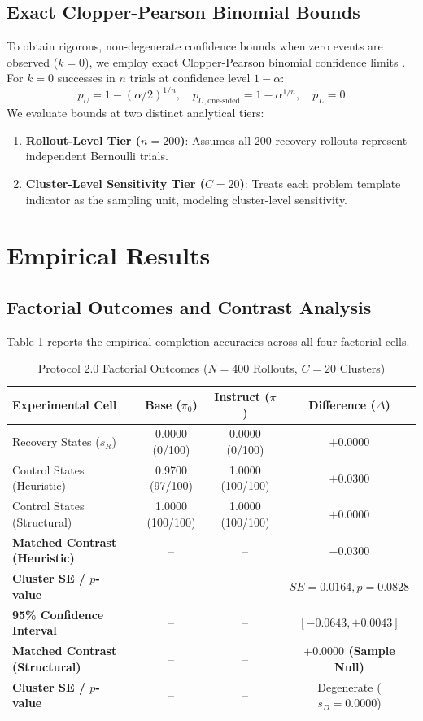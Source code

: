 \documentclass[11pt,letterpaper]{article}
\begin{document}
\subsection{Exact Clopper-Pearson Binomial Bounds}
To obtain rigorous, non-degenerate confidence bounds when zero events are observed ($k=0$), we employ exact Clopper-Pearson binomial confidence limits \cite{clopper1934use}. For $k=0$ successes in $n$ trials at confidence level $1 - \alpha$:
\begin{equation}
p_U = 1 - (\alpha/2)^{1/n}, \quad p_{U, \text{one-sided}} = 1 - \alpha^{1/n}, \quad p_L = 0
\end{equation}
We evaluate bounds at two distinct analytical tiers:
\begin{enumerate}
    \item \textbf{Rollout-Level Tier ($n=200$)}: Assumes all 200 recovery rollouts represent independent Bernoulli trials.
    \item \textbf{Cluster-Level Sensitivity Tier ($C=20$)}: Treats each problem template indicator as the sampling unit, modeling cluster-level sensitivity.
\end{enumerate}

\section{Empirical Results}

\subsection{Factorial Outcomes and Contrast Analysis}
Table \ref{tab:outcomes} reports the empirical completion accuracies across all four factorial cells.

\begin{table}[htbp]
\centering
\small
\caption{Protocol 2.0 Factorial Outcomes ($N=400$ Rollouts, $C=20$ Clusters)}
\label{tab:outcomes}
\begin{tabular}{lccc}
\toprule
\textbf{Experimental Cell} & \textbf{Base ($\pi_0$)} & \textbf{Instruct ($\pi$)} & \textbf{Difference ($\Delta$)} \\
\midrule
Recovery States ($s_R$) & 0.0000 (0/100) & 0.0000 (0/100) & $+0.0000$ \\
Control States (Heuristic) & 0.9700 (97/100) & 1.0000 (100/100) & $+0.0300$ \\
Control States (Structural) & 1.0000 (100/100) & 1.0000 (100/100) & $+0.0000$ \\
\midrule
\textbf{Matched Contrast (Heuristic)} & -- & -- & \textbf{$-0.0300$} \\
\textbf{Cluster SE / $p$-value} & -- & -- & $SE = 0.0164, p = 0.0828$ \\
\textbf{95\% Confidence Interval} & -- & -- & $[-0.0643, +0.0043]$ \\
\midrule
\textbf{Matched Contrast (Structural)} & -- & -- & \textbf{$+0.0000$ (Sample Null)} \\
\textbf{Cluster SE / $p$-value} & -- & -- & Degenerate ($s_D = 0.0000$) \\
\bottomrule
\end{tabular}
\end{table}
\end{document}
